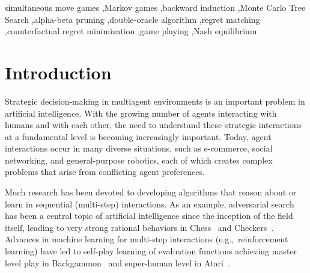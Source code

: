 \documentclass[preprint,12pt]{elsarticle}
\newcommand{\eg}{{e.g.,}~}
\newcounter{mlNoteCounter}
\newcounter{bbNoteCounter}
\newcommand{\mlanctot}[1]{{\small \color{darkgreen} $\blacksquare$ \refstepcounter{mlNoteCounter}\textsf{[ML]$_{\arabic{mlNoteCounter}}$:{#1}}}}
\newcommand{\bbosansky}[1]{{\small \color{orange} $\blacktriangle$ \refstepcounter{bbNoteCounter}\textsf{[BB]$_{\arabic{bbNoteCounter}}$:{#1}}}}
\begin{document}
\begin{frontmatter}
\begin{keyword}
simultaneous move games \sep Markov games \sep backward induction \sep Monte Carlo Tree Search \sep alpha-beta pruning \sep double-oracle algorithm \sep regret matching \sep counterfactual regret minimization \sep game playing \sep Nash equilibrium

\end{keyword}

\end{frontmatter}





\section{Introduction}
\label{sec:intro}

Strategic decision-making in multiagent environments is an important problem in artificial intelligence.
With the growing number of agents interacting with humans and with each other, the need to
understand these strategic interactions at a fundamental level is becoming increasingly important.
Today, agent interactions occur in many diverse situations, such as e-commerce, social networking, and
general-purpose robotics, each of which creates complex problems that arise from conflicting agent
preferences.

Much research has been devoted to developing algorithms that reason about or learn in sequential (multi-step)
interactions. As an example, adversarial search has been a central topic of artificial intelligence
since the inception of the field itself, leading to very strong rational behaviors in
Chess~\cite{Campbell02deepblue} and Checkers~\cite{Schaeffer96chinook}. Advances in machine learning for multi-step interactions
(\eg reinforcement learning) have led to self-play learning of evaluation functions achieving master level play
in Backgammon~\cite{Tesauro95TDGammon} and super-human level in Atari~\cite{mnih-dqn-2015}.
\end{document}
